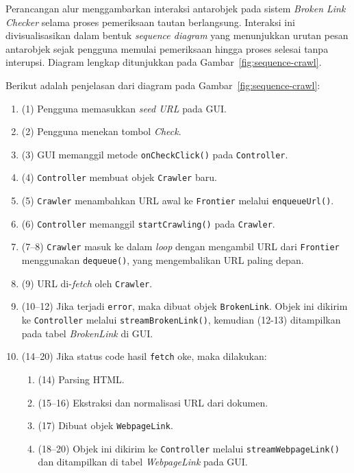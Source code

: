 
Perancangan alur menggambarkan interaksi antarobjek pada sistem \textit{Broken Link Checker} selama proses pemeriksaan tautan berlangsung. Interaksi ini divisualisasikan dalam bentuk \textit{sequence diagram} yang menunjukkan urutan pesan antarobjek sejak pengguna memulai pemeriksaan hingga proses selesai tanpa interupsi. Diagram lengkap ditunjukkan pada Gambar~\ref{fig:sequence-crawl}.

Berikut adalah penjelasan dari diagram pada Gambar~\ref{fig:sequence-crawl}:

\begin{enumerate}
    \item (1) Pengguna memasukkan \textit{seed URL} pada GUI.  
    \item (2) Pengguna menekan tombol \textit{Check}.  
    \item (3) GUI memanggil metode \texttt{onCheckClick()} pada \texttt{Controller}.  
    \item (4) \texttt{Controller} membuat objek \texttt{Crawler} baru.  
    \item (5) \texttt{Crawler} menambahkan URL awal ke \texttt{Frontier} melalui \texttt{enqueueUrl()}.  
    \item (6) \texttt{Controller} memanggil \texttt{startCrawling()} pada \texttt{Crawler}.  
    \item (7–8) \texttt{Crawler} masuk ke dalam \textit{loop} dengan mengambil URL dari \texttt{Frontier} menggunakan \texttt{dequeue()}, yang mengembalikan URL paling depan.  
    \item (9) URL di-\textit{fetch} oleh \texttt{Crawler}.  
    \item (10–12) Jika terjadi \texttt{error}, maka dibuat objek \texttt{BrokenLink}. Objek ini dikirim ke \texttt{Controller} melalui \texttt{streamBrokenLink()}, kemudian (12-13) ditampilkan pada tabel \textit{BrokenLink} di GUI.  
    \item (14–20) Jika status code hasil \texttt{fetch} oke, maka dilakukan:  
    \begin{enumerate}
        \item (14) Parsing HTML.  
        \item (15–16) Ekstraksi dan normalisasi URL dari dokumen.  
        \item (17) Dibuat objek \texttt{WebpageLink}.  
        \item (18–20) Objek ini dikirim ke \texttt{Controller} melalui \texttt{streamWebpageLink()} dan ditampilkan di tabel \textit{WebpageLink} pada GUI.  
    \end{enumerate}

\end{enumerate}
